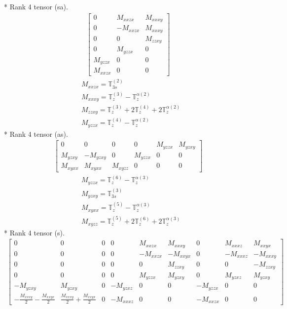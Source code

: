 \documentclass[fleqn,8pt,landscape]{jsarticle}
\begin{document}
* Rank 4 tensor (sa).
\begin{align*}
\begin{bmatrix} 0 & M_{xxzx} & M_{xxxy} \\ 0 & - M_{xxzx} & M_{xxxy} \\ 0 & 0 & M_{zzxy} \\ 0 & M_{yzzx} & 0 \\ M_{yzzx} & 0 & 0 \\ M_{xxzx} & 0 & 0 \end{bmatrix}
\end{align*}
\begin{align*}
& M_{xxzx} = \mathbb{T}_{3s}^{(2)} \\
& M_{xxxy} = \mathbb{T}_{z}^{(3)} - \mathbb{T}_{z}^{\alpha(2)} \\
& M_{zzxy} = \mathbb{T}_{z}^{(3)} + 2 \mathbb{T}_{z}^{(4)} + 2 \mathbb{T}_{z}^{\alpha(2)} \\
& M_{yzzx} = \mathbb{T}_{z}^{(4)} - \mathbb{T}_{z}^{\alpha(2)}
\end{align*}
* Rank 4 tensor (as).
\begin{align*}
\begin{bmatrix} 0 & 0 & 0 & 0 & M_{yzzx} & M_{yzxy} \\ M_{yzxy} & - M_{yzxy} & 0 & M_{yzzx} & 0 & 0 \\ M_{xyxx} & M_{xyxx} & M_{xyzz} & 0 & 0 & 0 \end{bmatrix}
\end{align*}
\begin{align*}
& M_{yzzx} = \mathbb{T}_{z}^{(6)} - \mathbb{T}_{z}^{\alpha(3)} \\
& M_{yzxy} = \mathbb{T}_{3s}^{(3)} \\
& M_{xyxx} = \mathbb{T}_{z}^{(5)} - \mathbb{T}_{z}^{\alpha(3)} \\
& M_{xyzz} = \mathbb{T}_{z}^{(5)} + 2 \mathbb{T}_{z}^{(6)} + 2 \mathbb{T}_{z}^{\alpha(3)}
\end{align*}
* Rank 4 tensor (s).
\begin{align*}
\begin{bmatrix} 0 & 0 & 0 & 0 & M_{xxzx} & M_{xxxy} & 0 & M_{xxxz} & M_{xxyx} \\ 0 & 0 & 0 & 0 & - M_{xxzx} & - M_{xxyx} & 0 & - M_{xxxz} & - M_{xxxy} \\ 0 & 0 & 0 & 0 & 0 & M_{zzxy} & 0 & 0 & - M_{zzxy} \\ 0 & 0 & 0 & 0 & M_{yzzx} & M_{yzxy} & 0 & M_{yzxz} & M_{yzxy} \\ - M_{yzxy} & M_{yzxy} & 0 & - M_{yzxz} & 0 & 0 & - M_{yzzx} & 0 & 0 \\ - \frac{M_{xxxy}}{2} - \frac{M_{xxyx}}{2} & \frac{M_{xxxy}}{2} + \frac{M_{xxyx}}{2} & 0 & - M_{xxxz} & 0 & 0 & - M_{xxzx} & 0 & 0 \end{bmatrix}
\end{align*}
\end{document}
